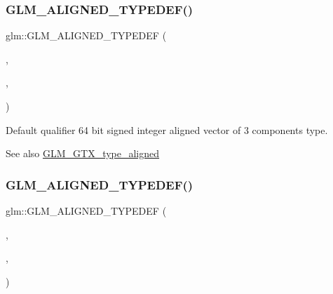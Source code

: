 \subsubsection{\texorpdfstring{G\+L\+M\+\_\+\+A\+L\+I\+G\+N\+E\+D\+\_\+\+T\+Y\+P\+E\+D\+E\+F()}{GLM\_ALIGNED\_TYPEDEF()}\hspace{0.1cm}{\footnotesize\ttfamily [67/209]}}
{\footnotesize\ttfamily glm\+::\+G\+L\+M\+\_\+\+A\+L\+I\+G\+N\+E\+D\+\_\+\+T\+Y\+P\+E\+D\+EF (\begin{DoxyParamCaption}\item[{\hyperlink{group__gtc__type__precision_gad7aa290b2d88847999c1305ed5c82669}{i64vec3}}]{,  }\item[{aligned\+\_\+i64vec3}]{,  }\item[{32}]{ }\end{DoxyParamCaption})}

Default qualifier 64 bit signed integer aligned vector of 3 components type. \begin{DoxySeeAlso}{See also}
\hyperlink{group__gtx__type__aligned}{G\+L\+M\+\_\+\+G\+T\+X\+\_\+type\+\_\+aligned} 
\end{DoxySeeAlso}
\mbox{\label{group__gtx__type__aligned_ga716f8ea809bdb11b5b542d8b71aeb04f}} 
\subsubsection{\texorpdfstring{G\+L\+M\+\_\+\+A\+L\+I\+G\+N\+E\+D\+\_\+\+T\+Y\+P\+E\+D\+E\+F()}{GLM\_ALIGNED\_TYPEDEF()}\hspace{0.1cm}{\footnotesize\ttfamily [68/209]}}
{\footnotesize\ttfamily glm\+::\+G\+L\+M\+\_\+\+A\+L\+I\+G\+N\+E\+D\+\_\+\+T\+Y\+P\+E\+D\+EF (\begin{DoxyParamCaption}\item[{\hyperlink{group__gtc__type__precision_ga77db970d924dd55ac93e00391ad4a10e}{i64vec4}}]{,  }\item[{aligned\+\_\+i64vec4}]{,  }\item[{32}]{ }\end{DoxyParamCaption})}

